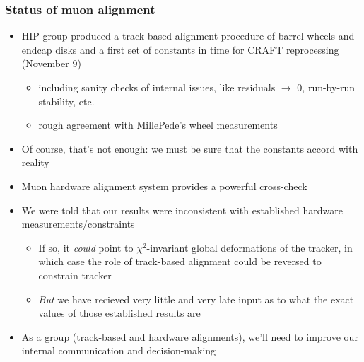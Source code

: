 \documentclass[compress]{beamer}
\begin{document}
\begin{frame}
\frametitle{Status of muon alignment}
\begin{itemize}
\item HIP group produced a track-based alignment procedure of barrel
  wheels and endcap disks and a first set of constants in time for
  CRAFT reprocessing (November 9)
\begin{itemize}
\item including sanity checks of internal issues, like residuals $\to$
  0, run-by-run stability, etc.
\item rough agreement with MillePede's wheel measurements
\end{itemize}

\item Of course, that's not enough: we must be sure that the constants
  accord with reality

\item Muon hardware alignment system provides a powerful cross-check

\item We were told that our results were inconsistent with established
  hardware measurements/constraints
\begin{itemize}
\item If so, it {\it could} point to $\chi^2$-invariant global
  deformations of the tracker, in which case the role of track-based
  alignment could be reversed to constrain tracker

\item {\it But} we have recieved very little and very late input as to
  what the exact values of those established results are
\end{itemize}

\item As a group (track-based and hardware alignments), we'll need to
  improve our internal communication and decision-making

\end{itemize}
\end{frame}
\end{document}
